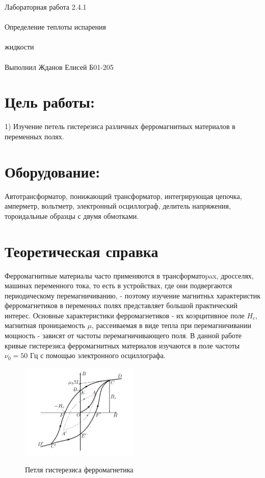 \documentclass{astroedu-lab}
\begin{document}
\pagestyle{plain}

\begin{problem}{\huge Лабораторная работа 2.4.1\\\\Определение теплоты испарения\\\\жидкости\\\\Выполнил Жданов Елисей Б01-205}

\section{Цель работы:}

1) Изучение петель гистерезиса различных ферромагнитных
материалов в переменных полях.


\section{Оборудование:}

Автотрансформатор, понижающий трансформатор,
интегрирующая цепочка, амперметр, вольтметр, электронный
осциллограф, делитель напряжения, тороидальные образцы с двумя обмотками.

\section{Теоретическая справка}

Ферромагнитные материалы часто применяются в трансформатоpax, дросселях, машинах переменного тока, то есть в устройствах, где они подвергаются периодическому перемагничиванию, - поэтому изучение магнитньх характеристик ферромагнетиков в переменньх полях представляет большой практический интерес. Основные характеристики ферромагнетиков - их коэрцитивное поле $H_c$, магнитная проницаемость $\mu$, рассеиваемая в виде тепла при перемагничивании мощность - зависят от частоты перемагничивающего поля. В данной работе кривые гистерезиса ферромагнитных материалов изучаются в поле частоты $\nu_0=50$ Гц с помощью электронного осциллографа.

\begin{figure}[!h]
	\centering
	\caption{Петля гистерезиса ферромагнетика}
	\includegraphics[width=0.5\textwidth]{theory.png}
	\label{fig:boiler}
\end{figure}


\end{problem}
\end{document}
